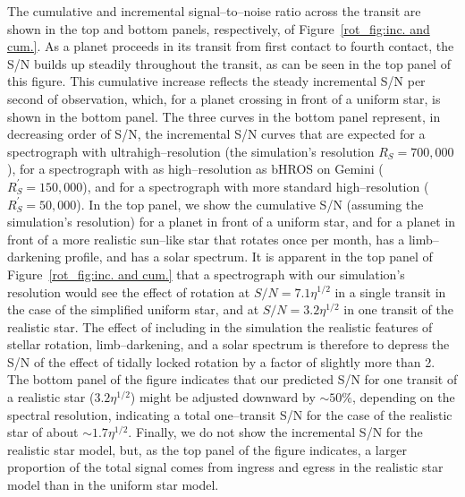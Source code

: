 The cumulative and incremental signal--to--noise ratio across the
transit are shown in the top and bottom panels, respectively, of
Figure~\ref{rot_fig:inc. and cum.}.  As a planet proceeds in its
transit from first contact to fourth contact, the S/N builds up
steadily throughout the transit, as can be seen in the top panel of
this figure.  This cumulative increase reflects the steady incremental
S/N per second of observation, which, for a planet crossing in front
of a uniform star, is shown in the bottom panel.  The three curves in
the bottom panel represent, in decreasing order of S/N, the
incremental S/N curves that are expected for a spectrograph with
ultrahigh--resolution (the simulation's resolution $R_S = 700,000$),
for a spectrograph with as high--resolution as bHROS on Gemini
($R^\prime_S = 150,000$), and for a spectrograph with more standard
high--resolution ($R^\prime_S = 50,000$).  In the top panel, we show
the cumulative S/N (assuming the simulation's resolution) for a planet
in front of a uniform star, and for a planet in front of a more
realistic sun--like star that rotates once per month, has a
limb--darkening profile, and has a solar spectrum.  It is apparent in
the top panel of Figure~\ref{rot_fig:inc. and cum.} that a
spectrograph with our simulation's resolution would see the effect of
rotation at $S/N = 7.1 \eta^{1/2}$ in a single transit in the case of
the simplified uniform star, and at $S/N = 3.2 \eta^{1/2}$ in one
transit of the realistic star.  The effect of including in the
simulation the realistic features of stellar rotation,
limb--darkening, and a solar spectrum is therefore to depress the S/N
of the effect of tidally locked rotation by a factor of slightly more
than 2.  The bottom panel of the figure indicates that our predicted
S/N for one transit of a realistic star ($3.2 \eta^{1/2}$) might be
adjusted downward by $\sim 50\%$, depending on the spectral
resolution, indicating a total one--transit S/N for the case of the
realistic star of about $\sim 1.7 \eta^{1/2}$.  Finally, we do not
show the incremental S/N for the realistic star model, but, as the top
panel of the figure indicates, a larger proportion of the total signal
comes from ingress and egress in the realistic star model than in the
uniform star model.
